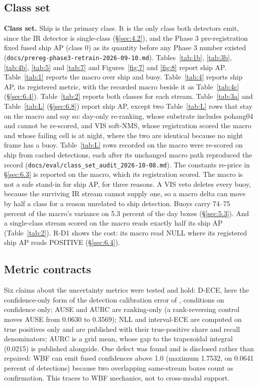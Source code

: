 \documentclass[10pt]{article}
\begin{document}
\subsection{Class set}\label{app:D.2}
\textbf{Class set.} Ship is the primary class. It is the only class both detectors emit, since the IR detector is single-class (\S\ref{sec:4.2}), and the Phase 3 pre-registration fixed fused ship AP (class 0) as its quantity before any Phase 3 number existed (\texttt{docs/\allowbreak{}prereg-phase3-retrain-2026-09-10.md}). Tables~\ref{tab:1b}, \ref{tab:3b}, \ref{tab:4b}, \ref{tab:5} and \ref{tab:7} and Figures~\ref{fig:7} and \ref{fig:8} report ship AP. Table~\ref{tab:1} reports the macro over ship and buoy. Table~\ref{tab:4} reports ship AP, its registered metric, with the recorded macro beside it as Table~\ref{tab:4c} (\S\ref{sec:6.4}). Table~\ref{tab:2} reports both classes for each stream. Table~\ref{tab:3a} and Table~\ref{tab:L} (\S\ref{sec:6.8}) report ship AP, except two Table~\ref{tab:L} rows that stay on the macro and say so: day-only re-ranking, whose substrate includes pohang04 and cannot be re-scored, and VIS soft-NMS, whose registration scored the macro and whose failing cell is at night, where the two are identical because no night frame has a buoy. Table~\ref{tab:L} rows recorded on the macro were re-scored on ship from cached detections, each after its unchanged macro path reproduced the record (\texttt{docs/\allowbreak{}eval/\allowbreak{}class\_\allowbreak{}set\_\allowbreak{}audit\_\allowbreak{}2026-10-08.md}). The constants re-price in \S\ref{sec:6.3} is reported on the macro, which its registration scored. The macro is not a safe stand-in for ship AP, for three reasons. A VIS veto deletes every buoy, because the surviving IR stream cannot supply one, so a macro delta can move by half a class for a reason unrelated to ship detection. Buoys carry 74--75 percent of the macro's variance on 5.3 percent of the day boxes (\S\ref{sec:5.3}). And a single-class stream scored on the macro reads exactly half its ship AP (Table~\ref{tab:2}). R-D1 shows the cost: its macro read NULL where its registered ship AP reads POSITIVE (\S\ref{sec:6.4}).

\subsection{Metric contracts}\label{app:D.3}
Six claims about the uncertainty metrics were tested and hold: D-ECE, here the confidence-only form of the detection calibration error of \citet{kuppers2020multivariate}, conditions on confidence only; AUSE \citep{ilg2018uncertainty} and AURC \citep{geifman2019biasreduced} are ranking-only (a rank-reversing control moves AUSE from 0.0630 to 0.3569); NLL and interval-ECE are computed on true positives only and are published with their true-positive share and recall denominators; AURC is a grid mean, whose gap to the trapezoidal integral (0.0215) is published alongside. One defect was found and is disclosed rather than repaired: WBF can emit fused confidences above 1.0 (maximum 1.7532, on 0.0641 percent of detections) because two overlapping same-stream boxes count as confirmation. This traces to WBF mechanics, not to cross-modal support.
\end{document}
